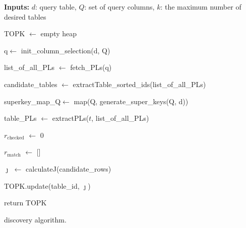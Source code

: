 \begin{algorithm} [t!]
\footnotesize
\textbf{Inputs:}
$d$: query table, $Q$: set of query columns, $k$: the maximum number of desired tables \label{code:inputs}

TOPK $\leftarrow$ empty heap \label{code:empty_heap}

q\textquotesingle $\leftarrow$  init\_column\_selection(d, Q) \label{code:ics}

list\_of\_all\_PLs $\leftarrow$ fetch\_PLs(q\textquotesingle) \label{code:fetch}

candidate\_tables $\leftarrow$ extractTable\_sorted\_ids(list\_of\_all\_PLs) \label{code:table_grouping}

superkey\_map\_Q$\leftarrow$ map(Q, generate\_super\_keys(Q, d)) \label{code:queryhashing}

 {\label{code:tableforloop}

table\_PLs $\leftarrow$ extractPLs($t$, list\_of\_all\_PLs) \label{code:get_table_pls}


		$r_{\text{checked}}$ $\leftarrow$  0 \label{code:init_checked_vals}

	$r_{\text{match}}$ $\leftarrow$ [] \label{code:init_candidates}
	
	$\jmath$ $\leftarrow$ calculateJ(candidate\_rows) \label{code:calc_jscore}
	
	TOPK.update(table\_id, $\jmath$)\label{code:topk_update}
}
return TOPK \label{code:return}


\caption{\system discovery algorithm.}
\label{alg:application}

\end{algorithm}
